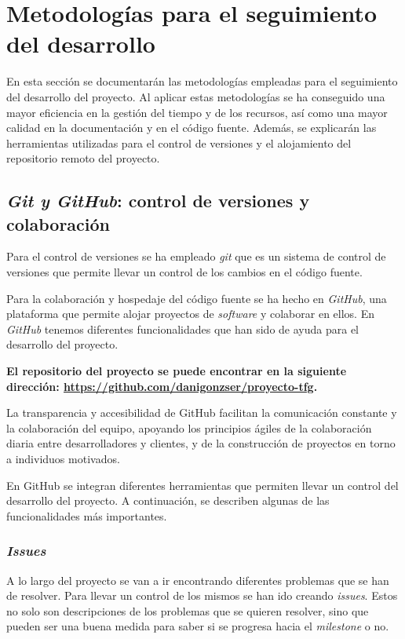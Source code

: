 \section{Metodologías para el seguimiento del desarrollo}

En esta sección se documentarán las metodologías empleadas para el seguimiento del desarrollo del proyecto. Al aplicar estas metodologías se ha conseguido una mayor eficiencia en la gestión del tiempo y de los recursos, así como una mayor calidad en la documentación y en el código fuente. Además, se explicarán las herramientas utilizadas para el control de versiones y el alojamiento del repositorio remoto del proyecto.

\subsection{\textit{Git y GitHub}: control de versiones y colaboración}

Para el control de versiones se ha empleado \textit{git} que es un sistema de control de versiones que permite llevar un control de los cambios en el código fuente.

Para la colaboración y hospedaje del código fuente se ha hecho en \textit{GitHub}, una plataforma que permite alojar proyectos de \textit{software} y colaborar en ellos. En \textit{GitHub} tenemos diferentes funcionalidades que han sido de ayuda para el desarrollo del proyecto.

\textbf{El repositorio del proyecto se puede encontrar en la siguiente dirección: \url{https://github.com/danigonzser/proyecto-tfg}.}

La transparencia y accesibilidad de GitHub facilitan la comunicación constante y la colaboración del equipo, apoyando los principios ágiles de la colaboración diaria entre desarrolladores y clientes, y de la construcción de proyectos en torno a individuos motivados.

En GitHub se integran diferentes herramientas que permiten llevar un control del desarrollo del proyecto. A continuación, se describen algunas de las funcionalidades más importantes.

\subsubsection{\textit{Issues}}

A lo largo del proyecto se van a ir encontrando diferentes problemas que se han de resolver. Para llevar un control de los mismos se han ido creando \textit{issues}. Estos no solo son descripciones de los problemas que se quieren resolver, sino que pueden ser una buena medida para saber si se progresa hacia el \textit{milestone} o no.

